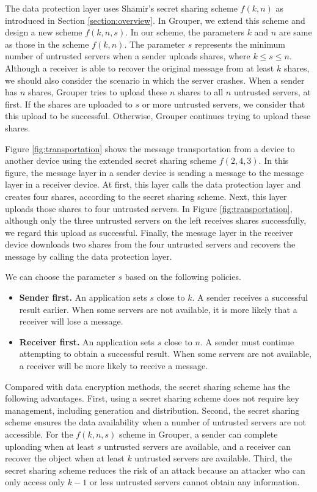 \documentclass[a4paper,11pt]{report}
\begin{document}
The data protection layer uses Shamir's secret sharing scheme $f(k, n)$ as introduced in Section \ref{section:overview}.
In Grouper, we extend this scheme and design a new scheme $ f(k, n, s)$.
In our scheme, the parameters $k$ and $n$ are same as those in the scheme $f(k, n)$. 
The parameter $s$ represents the minimum number of untrusted servers when a sender uploads shares, where $k \leq s \leq n$.
Although a receiver is able to recover the original message from at least $k$ shares, we should also consider the scenario in which the server crashes. 
When a sender has $n$ shares, Grouper tries to upload these $n$ shares to all $n$ untrusted servers, at first. 
If the shares are uploaded to $s$ or more untrusted servers, we consider that this upload to be successful.
Otherwise, Grouper continues trying to upload these shares.

Figure \ref{fig:transportation} shows the message transportation from a device to another device using the extended secret sharing scheme $f(2, 4, 3)$.
In this figure, the message layer in a sender device is sending a message to the message layer in a receiver device.
At first, this layer calls the data protection layer and creates four shares, according to the secret sharing scheme.
Next, this layer uploads those shares to four untrusted servers.
In Figure \ref{fig:transportation}, although only the three untrusted servers on the left receives shares successfully, we regard this upload as successful.
Finally, the message layer in the receiver device downloads two shares from the four untrusted servers and recovers the message by calling the data protection layer.

We can choose the parameter $s$ based on the following policies.

\begin{itemize}[leftmargin=7mm]
	\setlength{\itemsep}{1pt}
	\setlength{\parskip}{0pt}
	\setlength{\parsep}{0pt}
	\item \textbf{Sender first.} 
	An application sets $s$ close to $k$. 
	A sender receives a successful result earlier.
	When some servers are not available, it is more likely that a receiver will lose a message.
	\item \textbf{Receiver first.}
	An application sets $s$ close to $n$. 
	A sender must continue attempting to obtain a successful result.
	When some servers are not available, a receiver will be more likely to receive a message.
\end{itemize}

Compared with data encryption methods, the secret sharing scheme has the following advantages.
First, using a secret sharing scheme does not require key management, including generation and distribution.
Second, the secret sharing scheme ensures the data availability when a number of untrusted servers are not accessible.
For the $f(k, n, s)$ scheme in Grouper, a sender can complete uploading when at least $s$ untrusted servers are available, and a receiver can recover the object when at least $k$ untrusted servers are available.
Third, the secret sharing scheme reduces the risk of an attack because an attacker who can only access only $k-1$ or less untrusted servers cannot obtain any information.
\end{document}
